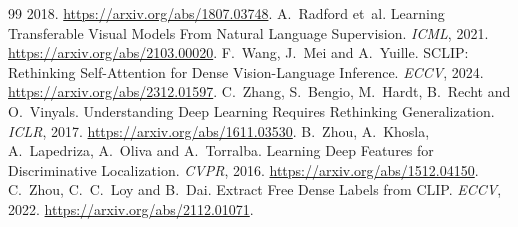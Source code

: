 \documentclass[11pt]{article}
\begin{document}
\begin{thebibliography}{99}
2018. \url{https://arxiv.org/abs/1807.03748}.
A.~Radford et~al. Learning Transferable Visual Models From Natural Language Supervision. \emph{ICML}, 2021.
\url{https://arxiv.org/abs/2103.00020}.
F.~Wang, J.~Mei and A.~Yuille. SCLIP: Rethinking Self-Attention for Dense Vision-Language Inference. \emph{ECCV}, 2024.
\url{https://arxiv.org/abs/2312.01597}.
C.~Zhang, S.~Bengio, M.~Hardt, B.~Recht and O.~Vinyals. Understanding Deep Learning Requires Rethinking Generalization.
\emph{ICLR}, 2017. \url{https://arxiv.org/abs/1611.03530}.
B.~Zhou, A.~Khosla, A.~Lapedriza, A.~Oliva and A.~Torralba. Learning Deep Features for Discriminative Localization.
\emph{CVPR}, 2016. \url{https://arxiv.org/abs/1512.04150}.
C.~Zhou, C.~C.~Loy and B.~Dai. Extract Free Dense Labels from CLIP. \emph{ECCV}, 2022.
\url{https://arxiv.org/abs/2112.01071}.
\end{thebibliography}
\endgroup
\end{document}
